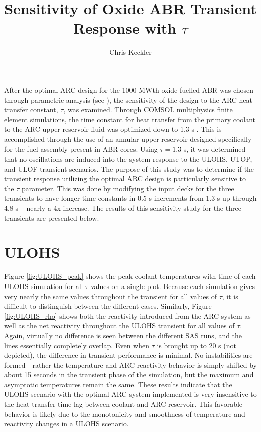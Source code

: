 \documentclass[11pt, oneside]{article}   	%
\title{Sensitivity of Oxide ABR Transient Response with $\tau$}
\author{Chris Keckler}
\begin{document}
\maketitle

After the optimal ARC design for the 1000 MWth oxide-fuelled ABR was chosen through parametric analysis (see \cite{2017ANSWinter_ARC}), the sensitivity of the design to the ARC heat transfer constant, $\tau$, was examined.
Through COMSOL multiphysics finite element simulations, the time constant for heat transfer from the primary coolant to the ARC upper reservoir fluid was optimized down to 1.3 s \cite{1stARC_paper}.
This is accomplished through the use of an annular upper reservoir designed specifically for the fuel assembly present in ABR cores. 
Using $\tau=1.3$ s, it was determined that no oscillations are induced into the system response to the ULOHS, UTOP, and ULOF transient scenarios. 
The purpose of this study was to determine if the transient response utilizing the optimal ARC design is particularly sensitive to the $\tau$ parameter. 
This was done by modifying the input decks for the three transients to have longer time constants in 0.5 s increments from 1.3 s up through 4.8 s -- nearly a 4x increase.
The results of this sensitivity study for the three transients are presented below.

\section{ULOHS}
Figure \ref{fig:ULOHS_peak} shows the peak coolant temperatures with time of each ULOHS simulation for all $\tau$ values on a single plot. 
Because each simulation gives very nearly the same values throughout the transient for all values of $\tau$, it is difficult to distinguish between the different cases. 
Similarly, Figure \ref{fig:ULOHS_rho} shows both the reactivity introduced from the ARC system as well as the net reactivity throughout the ULOHS transient for all values of $\tau$. 
Again, virtually no difference is seen between the different SAS runs, and the lines essentially completely overlap. 
Even when $\tau$ is brought up to 20 s (not depicted), the difference in transient performance is minimal.
No instabilities are formed - rather the temperature and ARC reactivity behavior is simply shifted by about 15 seconds in the transient phase of the simulation, but the maximum and asymptotic temperatures remain the same.
These results indicate that the ULOHS scenario with the optimal ARC system implemented is very insensitive to the heat transfer time lag between coolant and ARC reservoir.
This favorable behavior is likely due to the monotonicity and smoothness of temperature and reactivity changes in a ULOHS scenario.
\end{document}
